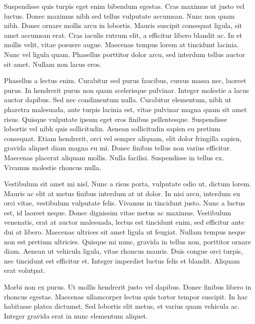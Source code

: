 \documentclass[a4paper,twoside,notitlepage,openright,11pt]{report}
\begin{document}
Suspendisse quis turpis eget enim bibendum egestas. Cras maximus ut justo vel luctus. Donec maximus nibh sed tellus vulputate accumsan. Nunc non quam nibh. Donec ornare mollis arcu in lobortis. Mauris suscipit consequat ligula, sit amet accumsan erat. Cras iaculis rutrum elit, a efficitur libero blandit ac. In et mollis velit, vitae posuere augue. Maecenas tempus lorem at tincidunt lacinia. Nunc vel ligula quam. Phasellus porttitor dolor arcu, sed interdum tellus auctor sit amet. Nullam non lacus eros.

Phasellus a lectus enim. Curabitur sed purus faucibus, cursus massa nec, laoreet purus. In hendrerit purus non quam scelerisque pulvinar. Integer molestie a lacus auctor dapibus. Sed nec condimentum nulla. Curabitur elementum, nibh ut pharetra malesuada, ante turpis lacinia est, vitae pulvinar magna quam sit amet risus. Quisque vulputate ipsum eget eros finibus pellentesque. Suspendisse lobortis vel nibh quis sollicitudin. Aenean sollicitudin sapien eu pretium consequat. Etiam hendrerit, orci vel semper aliquam, elit dolor fringilla sapien, gravida aliquet diam magna eu mi. Donec finibus tellus non varius efficitur. Maecenas placerat aliquam mollis. Nulla facilisi. Suspendisse in tellus ex. Vivamus molestie rhoncus nulla.

Vestibulum sit amet mi nisl. Nunc a risus porta, vulputate odio ut, dictum lorem. Mauris ac elit at metus finibus interdum at ut dolor. In nisi arcu, interdum eu orci vitae, vestibulum vulputate felis. Vivamus in tincidunt justo. Nunc a luctus est, id laoreet neque. Donec dignissim vitae metus ac maximus. Vestibulum venenatis, erat at auctor malesuada, lectus est tincidunt enim, sed efficitur ante dui at libero. Maecenas ultrices sit amet ligula ut feugiat. Nullam tempus neque non est pretium ultricies. Quisque mi nunc, gravida in tellus non, porttitor ornare diam. Aenean ut vehicula ligula, vitae rhoncus mauris. Duis congue orci turpis, nec tincidunt est efficitur et. Integer imperdiet luctus felis et blandit. Aliquam erat volutpat.

Morbi non ex purus. Ut mollis hendrerit justo vel dapibus. Donec finibus libero in rhoncus egestas. Maecenas ullamcorper lectus quis tortor tempor suscipit. In hac habitasse platea dictumst. Sed lobortis elit metus, et varius quam vehicula ac. Integer gravida erat in nunc elementum aliquet.



{}

\printindex
\markboth{\MakeUppercase{\indexname}}{}
\end{document}
